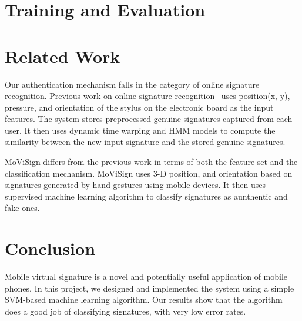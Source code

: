 \documentclass[12pt]{article}
\begin{document}
\section{Training and Evaluation}

\section{Related Work}

Our authentication mechanism falls in the category of online signature recognition. Previous work on online signature recognition~\cite{zanuy:2006} uses position(x, y), pressure, and orientation of the stylus on the electronic board as the input features. The system stores preprocessed genuine signatures captured from each user. It then uses dynamic time warping and HMM models to compute the similarity between the new input signature and the stored genuine signatures.

MoViSign differs from the previous work in terms of both the feature-set and the classification mechanism. MoViSign uses 3-D position, and orientation based on signatures generated by hand-gestures using mobile devices. It then uses supervised machine learning algorithm to classify signatures as aunthentic and fake ones.
 
\section{Conclusion}

Mobile virtual signature is a novel and potentially useful application of mobile phones. In this project, we designed and implemented the system using a simple SVM-based machine learning algorithm. Our results show that the algorithm does a good job of classifying signatures, with very low error rates.


	
\end{document}
